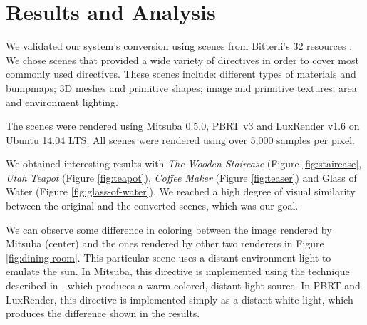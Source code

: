 \section{Results and Analysis}
We validated our system's conversion using scenes from Bitterli's 32 resources 
\cite{resources16}. We chose scenes that provided a wide variety of directives 
in order to cover most commonly used directives. These scenes include: different 
types of materials and bumpmaps; 3D meshes and primitive shapes; image and 
primitive textures; area and environment lighting. 

The scenes were rendered using Mitsuba 0.5.0, PBRT v3 and LuxRender v1.6 on 
Ubuntu 14.04 LTS. All scenes were rendered using over 5,000 samples per pixel. 

We obtained interesting results with \textit{The Wooden Staircase} (Figure 
\ref{fig:staircase}, \textit{Utah Teapot} (Figure \ref{fig:teapot}), 
\textit{Coffee Maker} (Figure \ref{fig:teaser}) and Glass of Water (Figure 
\ref{fig:glass-of-water}). We reached a high degree of visual similarity between 
the original and the converted scenes, which was our goal.

We can observe some difference in coloring between the image rendered by Mitsuba 
(center) and the ones rendered by other two renderers in Figure 
\ref{fig:dining-room}. This particular scene uses a distant environment light to 
emulate the sun. In Mitsuba, this directive is implemented using the technique 
described in \cite{}, which produces a warm-colored, distant light source. In 
PBRT and LuxRender, this directive is implemented simply as a distant white 
light, which produces the difference shown in the results.

